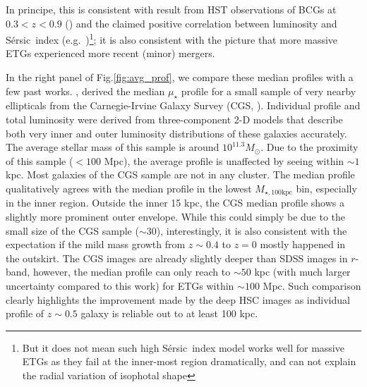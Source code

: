 \documentclass{emulateapj}
\def\ser{{S\'{e}rsic\ }}
\def\rbcg{\texttt{cenHighMh}}
\def\nbcg{\texttt{cenLowMh}}
\def\mtot{{$M_{\star,100\mathrm{kpc}}$}}
\def\mden{{$\mu_{\star}$}}
\begin{document}
\begin{CJK*}{UTF8}{gbsn}
    In principe, this is consistent with result from HST observations of BCGs at 
    $0.3 < z <0.9$ (\citealt{Bai2014}) and the claimed positive correlation between 
    luminosity and \ser index (e.g.\ \citealt{Savorgnan13})\footnote{But it does not mean 
    such high \ser index model works well for massive ETGs as they fail at the inner-most 
    region dramatically, and can not explain the radial variation of isophotal shape}; 
    it is also consistent with the picture that more massive ETGs experienced more recent 
    (minor) mergers.  
    
    
    In the right panel of Fig.\ref{fig:avg_prof}, we compare these median profiles with 
    a few past works.  
    \citep{Huang2013a}, derived the median \mden{} profile for a small sample of very nearby 
    ellipticals from the Carnegie-Irvine Galaxy Survey (CGS, \citealt{CGS1}).
    Individual profile and total luminosity were derived from three-component 2-D models 
    that describe both very inner and outer luminosity distributions of these galaxies 
    accurately. 
    The average stellar mass of this sample is around $10^{11.3} M_{\odot}$.
    Due to the proximity of this sample ($< 100$ Mpc), the average profile is unaffected by 
    seeing within $\sim 1$ kpc.
    Most galaxies of the CGS sample are not in any cluster.
    The median profile qualitatively agrees with the median profile in the lowest 
    \mtot{} bin, especially in the inner region. 
    Outside the inner 15 kpc, the CGS median profile shows a slightly more prominent 
    outer envelope.  
    While this could simply be due to the small size of the CGS sample ($\sim 30$),
    interestingly, it is also consistent with the expectation if the mild mass growth 
    from $z\sim 0.4$ to $z=0$ mostly happened in the outskirt.   
    The CGS images are already slightly deeper than SDSS images in $r$-band,
    however, the median profile can only reach to $\sim 50$ kpc (with much larger 
    uncertainty compared to this work) for ETGs within $\sim 100$ Mpc.
    Such comparison clearly highlights the improvement made by the deep HSC images as 
    individual profile of $z\sim 0.5$ galaxy is reliable out to at least 100 kpc.  
    

\end{CJK*}
\end{document}
